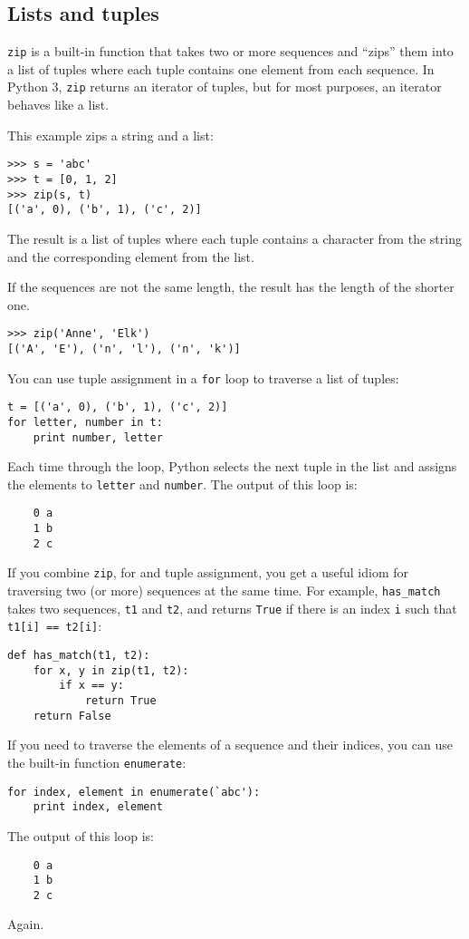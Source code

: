 \documentclass{article}
\begin{document}
\subsection{Lists and tuples}
\verb|zip| is a built-in function that takes two or more sequences and
``zips'' them into a list of tuples where each tuple contains one element from
each sequence. In Python 3, \verb|zip| returns an iterator of tuples, but for
most purposes, an iterator behaves like a list.

This example zips a string and a list:
\begin{verbatim}
>>> s = 'abc'
>>> t = [0, 1, 2]
>>> zip(s, t)
[('a', 0), ('b', 1), ('c', 2)]
\end{verbatim}
The result is a list of tuples where each tuple contains a character
from the string and the corresponding element from the list.

If the sequences are not the same length, the result has the length of
the shorter one.

\begin{verbatim}
>>> zip('Anne', 'Elk')
[('A', 'E'), ('n', 'l'), ('n', 'k')]
\end{verbatim}
You can use tuple assignment in a \verb|for| loop to traverse a list of
tuples:
\begin{verbatim}
t = [('a', 0), ('b', 1), ('c', 2)]
for letter, number in t:
    print number, letter
\end{verbatim}
Each time through the loop, Python selects the next tuple in the
list and assigns the elements to \verb|letter| and \verb|number|.
The output of this loop is:
\begin{verbatim}
    0 a
    1 b
    2 c
\end{verbatim}
If you combine \verb|zip|, for and tuple assignment, you get a useful
idiom for traversing two (or more) sequences at the same time. For
example, \verb|has_match| takes two sequences, \verb|t1| and \verb|t2|,
and returns \verb|True| if there is an index \verb|i| such that
\verb|t1[i] == t2[i]|:
\begin{verbatim}
def has_match(t1, t2):
    for x, y in zip(t1, t2):
        if x == y:
            return True
    return False
\end{verbatim}
If you need to traverse the elements of a sequence and their indices, you
can use the built-in function \verb|enumerate|:
\begin{verbatim}
for index, element in enumerate(`abc'):
    print index, element
\end{verbatim}
The output of this loop is:
\begin{verbatim}
    0 a
    1 b
    2 c
\end{verbatim}
Again.
\end{document}
